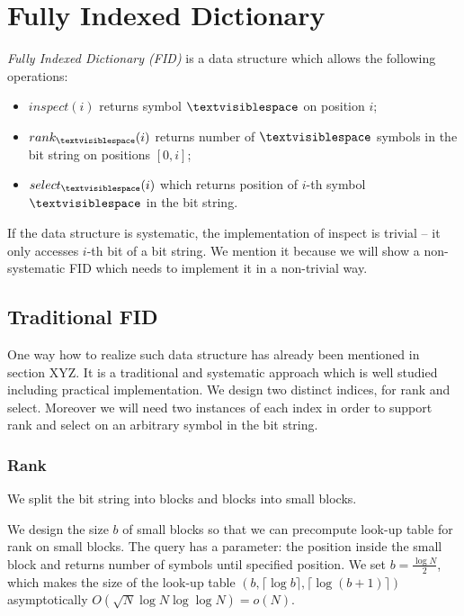 \chapter{Fully Indexed Dictionary}

\def\ph{\textvisiblespace}

\emph{Fully Indexed Dictionary (FID)} is a data structure which allows the following operations:
\begin{itemize}
	\item \emph{$inspect(i)$} returns symbol $\ph$ on position $i$;
	\item \emph{$rank_{\ph}(i)$} returns number of $\ph$ symbols in the bit string on positions $[0, i]$;
	\item \emph{$select_{\ph}(i)$} which returns position of $i$-th symbol $\ph$ in the bit string.
\end{itemize}

If the data structure is systematic, the implementation of inspect is trivial -- it only accesses $i$-th bit of a bit string.
We mention it because we will show a non-systematic FID which needs to implement it in a non-trivial way.

\section{Traditional FID}

One way how to realize such data structure has already been mentioned in section XYZ.
It is a traditional and systematic approach which is well studied including practical implementation.
We design two distinct indices, for rank and select.
Moreover we will need two instances of each index in order to support rank and select on an arbitrary symbol in the bit string.

\subsection{Rank}

We split the bit string into blocks and blocks into small blocks.

We design the size $b$ of small blocks so that we can precompute look-up table for rank on small blocks.
The query has a parameter: the position inside the small block and returns number of symbols until specified position.
We set $b = \frac{\log N}{2}$, which makes the size of the look-up table $(b, \lceil \log b \rceil, \lceil \log (b + 1) \rceil)$ asymptotically $O(\sqrt{N} \log N \log \log N) = o(N)$.

